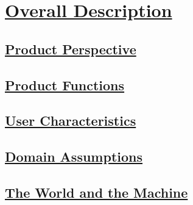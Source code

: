 \section[Overall Description]{\hyperlink{toc}{Overall Description}}

\subsection[Product Perspective]{\hyperlink{toc}{Product Perspective}}

\subsection[Product Functions]{\hyperlink{toc}{Product Functions}}

\subsection[User Characteristics]{\hyperlink{toc}{User Characteristics}}

\subsection[Domain Assumptions]{\hyperlink{toc}{Domain Assumptions}}

\subsection[The World and the Machine]{\hyperlink{toc}{The World and the Machine}}